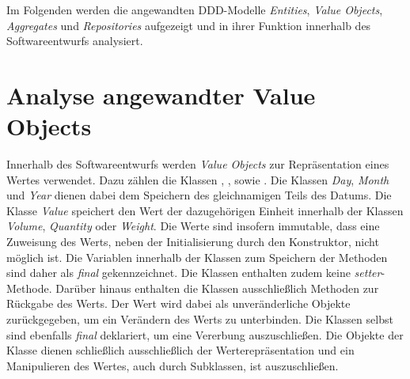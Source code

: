 Im Folgenden werden die angewandten \ac{DDD}-Modelle \textit{Entities}, \textit{Value Objects}, \textit{Aggregates} und \textit{Repositories} aufgezeigt und in ihrer Funktion innerhalb des Softwareentwurfs analysiert.

\section{Analyse angewandter Value Objects}
\label{domaindrivendesign>valueobjects}
Innerhalb des Softwareentwurfs werden \textit{Value Objects} zur Repräsentation eines Wertes verwendet.
Dazu zählen die Klassen \href{}{}, \href{}{}, \href{}{} sowie \href{}{}.
Die Klassen \href{}{\code{}}\textit{Day}, \href{}{\code{}}\textit{Month} und \href{}{\code{}}\textit{Year} dienen dabei dem Speichern des gleichnamigen Teils des Datums.
Die Klasse \href{}{\code{}}\textit{Value} speichert den Wert der dazugehörigen Einheit innerhalb der Klassen \href{}{\code{}}\textit{Volume}, \href{}{\code{}}\textit{Quantity} oder \href{}{\code{}}\textit{Weight}.
Die Werte sind insofern immutable, dass eine Zuweisung des Werts, neben der Initialisierung durch den Konstruktor, nicht möglich ist.
Die Variablen innerhalb der Klassen zum Speichern der Methoden sind daher als \textit{final} gekennzeichnet.
Die Klassen enthalten zudem keine \textit{setter}-Methode.
Darüber hinaus enthalten die Klassen ausschließlich Methoden zur Rückgabe des Werts.
Der Wert wird dabei als unveränderliche Objekte zurückgegeben, um ein Verändern des Werts zu unterbinden.
Die Klassen selbst sind ebenfalls \textit{final} deklariert, um eine Vererbung auszuschließen.
Die Objekte der Klasse dienen schließlich ausschließlich der Werterepräsentation und ein Manipulieren des Wertes, auch durch Subklassen, ist auszuschließen.


